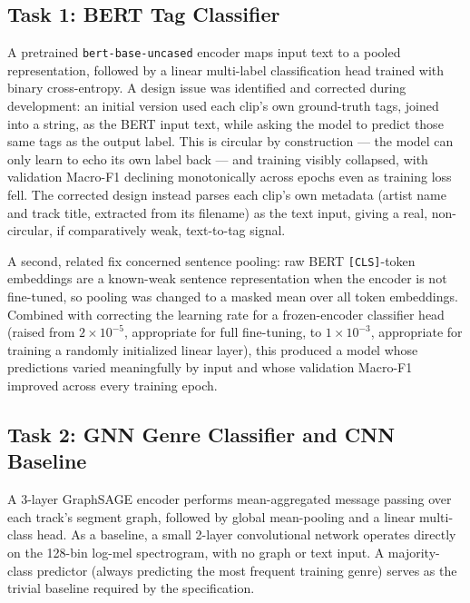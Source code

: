 \documentclass[conference]{IEEEtran}
\begin{document}
\subsection{Task 1: BERT Tag Classifier}
\label{sec:task1model}
A pretrained \texttt{bert-base-uncased} encoder maps input text to a pooled representation, followed by a linear multi-label classification head trained with binary cross-entropy. A design issue was identified and corrected during development: an initial version used each clip's own ground-truth tags, joined into a string, as the BERT input text, while asking the model to predict those same tags as the output label. This is circular by construction --- the model can only learn to echo its own label back --- and training visibly collapsed, with validation Macro-F1 declining monotonically across epochs even as training loss fell. The corrected design instead parses each clip's own metadata (artist name and track title, extracted from its filename) as the text input, giving a real, non-circular, if comparatively weak, text-to-tag signal.

A second, related fix concerned sentence pooling: raw BERT \texttt{[CLS]}-token embeddings are a known-weak sentence representation when the encoder is not fine-tuned, so pooling was changed to a masked mean over all token embeddings. Combined with correcting the learning rate for a frozen-encoder classifier head (raised from $2\times10^{-5}$, appropriate for full fine-tuning, to $1\times10^{-3}$, appropriate for training a randomly initialized linear layer), this produced a model whose predictions varied meaningfully by input and whose validation Macro-F1 improved across every training epoch.

\subsection{Task 2: GNN Genre Classifier and CNN Baseline}
A 3-layer GraphSAGE encoder performs mean-aggregated message passing over each track's segment graph, followed by global mean-pooling and a linear multi-class head. As a baseline, a small 2-layer convolutional network operates directly on the 128-bin log-mel spectrogram, with no graph or text input. A majority-class predictor (always predicting the most frequent training genre) serves as the trivial baseline required by the specification.
\end{document}
